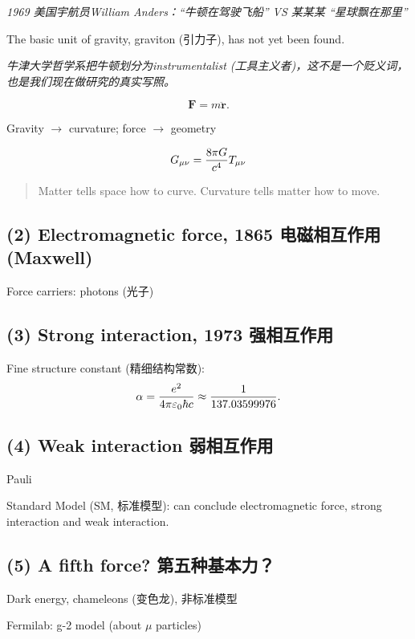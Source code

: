 \emph{1969 美国宇航员William Anders：``牛顿在驾驶飞船'' VS 某某某
``星球飘在那里''}

The basic unit of gravity, graviton (引力子), has not yet been found.

\emph{牛津大学哲学系把牛顿划分为instrumentalist (工具主义者)，这不是一个贬义词，也是我们现在做研究的真实写照。}

\[\boldsymbol F= m \ddot{\boldsymbol{r}}.\]

Gravity $\rightarrow$ curvature; force $\rightarrow$ geometry

\[G_{\mu\nu} = {8 \pi G \over c^4} T_{\mu\nu}\]

\begin{quote}
Matter tells space how to curve. Curvature tells matter how to move.
\end{quote}

\subsection*{(2) Electromagnetic force, 1865 电磁相互作用 (Maxwell)}\label{electromagnetic-force-1865-ux7535ux78c1ux76f8ux4e92ux4f5cux7528-maxwell}

Force carriers: photons (光子)

\subsection*{(3) Strong interaction, 1973 强相互作用}\label{strong-interaction-1973-ux5f3aux76f8ux4e92ux4f5cux7528}

Fine structure constant (精细结构常数):
\[\alpha = {e^2 \over 4 \pi \varepsilon_0 \hbar c} \approx {1 \over 137.03599976}.\]

\subsection*{(4) Weak interaction 弱相互作用}\label{weak-interaction-ux5f31ux76f8ux4e92ux4f5cux7528}

Pauli

Standard Model (SM, 标准模型): can conclude electromagnetic force, strong interaction and weak interaction.

\subsection*{(5) A fifth force? 第五种基本力？}\label{a-fifth-force-ux7b2cux4e94ux79cdux57faux672cux529b}

Dark energy, chameleons (变色龙), 非标准模型

Fermilab: g-2 model (about \(\mu\) particles)

